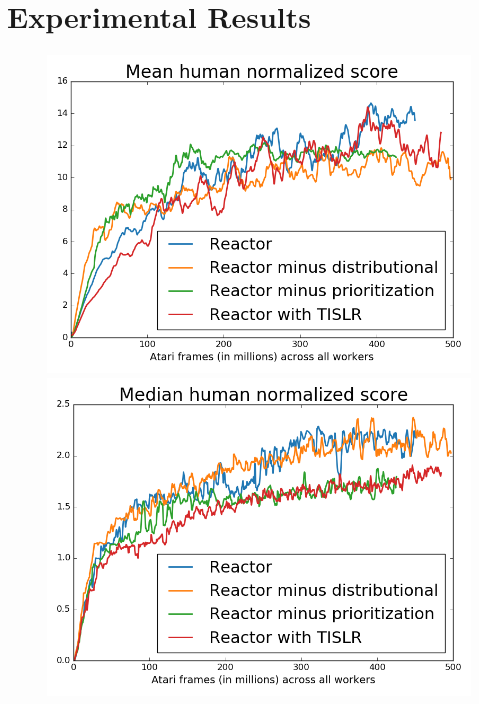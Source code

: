 \documentclass{article}
\begin{document}
\section{Experimental Results}\label{sec:results}
\iffalse
\begin{figure}
\centering
\vspace{0pt}
\begin{minipage}{.32\textwidth}
  \centerline{\includegraphics[width=1.0\textwidth]{aggregate_mean}}
\end{minipage}%
\vspace{0pt}
\begin{minipage}{.32\textwidth}
\vspace{0pt}
  \centering
  \includegraphics[width=1.0\textwidth]{aggregate_median}

\end{minipage}
\end{figure}
\end{document}
